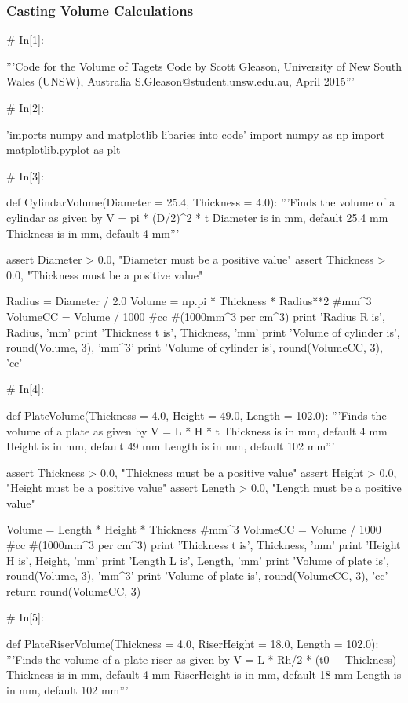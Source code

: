 \documentclass[a4paper,8pt]{article}
\begin{document}
\subsubsection{Casting Volume Calculations}

\begin{python}
	# In[1]:
	
	'''Code for the Volume of Tagets
	Code by Scott Gleason, University of New South Wales (UNSW), Australia 
	S.Gleason@student.unsw.edu.au, April 2015'''
	
	
	# In[2]:
	
	'imports numpy and matplotlib libaries into code'
	import numpy as np
	import matplotlib.pyplot as plt
	
	
	# In[3]:
	
	def CylindarVolume(Diameter = 25.4, Thickness = 4.0):
	'''Finds the volume of a cylindar as given by 
	V = pi * (D/2)^2 * t
	Diameter is in mm, default 25.4 mm
	Thickness is in mm, default 4 mm'''
	
	assert Diameter > 0.0, "Diameter must be a positive value"
	assert Thickness > 0.0, "Thickness must be a positive value"
	
	Radius = Diameter / 2.0
	Volume = np.pi * Thickness * Radius**2 #mm^3
	VolumeCC = Volume / 1000 #cc #(1000mm^3 per cm^3)
	print 'Radius R is', Radius, 'mm'
	print 'Thickness t is', Thickness, 'mm'
	print 'Volume of cylinder is', round(Volume, 3), 'mm^3'
	print 'Volume of cylinder is', round(VolumeCC, 3), 'cc'
	
	
	# In[4]:
	
	def PlateVolume(Thickness = 4.0, Height = 49.0, Length = 102.0):
	'''Finds the volume of a plate as given by 
	V = L * H * t
	Thickness is in mm, default 4 mm
	Height is in mm, default 49 mm
	Length is in mm, default 102 mm'''
	
	assert Thickness > 0.0, "Thickness must be a positive value"
	assert Height > 0.0, "Height must be a positive value"
	assert Length > 0.0, "Length must be a positive value"
	
	Volume = Length * Height * Thickness #mm^3
	VolumeCC = Volume / 1000 #cc #(1000mm^3 per cm^3)
	print 'Thickness t is', Thickness, 'mm'
	print 'Height H is', Height, 'mm'
	print 'Length L is', Length, 'mm'
	print 'Volume of plate is', round(Volume, 3), 'mm^3'
	print 'Volume of plate is', round(VolumeCC, 3), 'cc'
	return round(VolumeCC, 3)
	
	
	# In[5]:
	
	def PlateRiserVolume(Thickness = 4.0, RiserHeight = 18.0, Length = 102.0):
	'''Finds the volume of a plate riser as given by 
	V = L * Rh/2 * (t0 + Thickness)
	Thickness is in mm, default 4 mm
	RiserHeight is in mm, default 18 mm
	Length is in mm, default 102 mm'''
	

\end{python}
\end{document}
